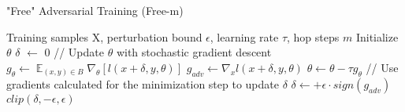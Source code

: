 \documentclass{article}
\DeclareMathOperator{\EX}{\mathbb{E}}%
\begin{document}
\begin{algorithm}[H]
	\caption{"Free" Adversarial Training (Free-m)}
	\begin{algorithmic}[1]
		\Require Training samples X, perturbation bound $\epsilon$, learning rate $\tau$, hop steps $m$
		\State Initialize $\theta$
		\State $\delta$ $\leftarrow$ 0
		\State // Update $\theta$ with stochastic gradient descent
		\State $g_{\theta} \leftarrow \EX_{(x,y) \in B} \nabla_{\theta} [l(x+\delta, y, \theta)]$
		\State $g_{adv} \leftarrow \nabla_{x} l(x+\delta, y, \theta)$
		\State $\theta \leftarrow \theta - \tau g_{\theta}$
		\State // Use gradients calculated for the minimization step to update $\delta$
		\State $\delta \leftarrow + \epsilon \cdot sign(g_{adv})$
		\State $clip(\delta, -\epsilon, \epsilon)$
		\EndFor
		\EndFor
		\EndFor
	\end{algorithmic}
\end{algorithm}
\end{document}
